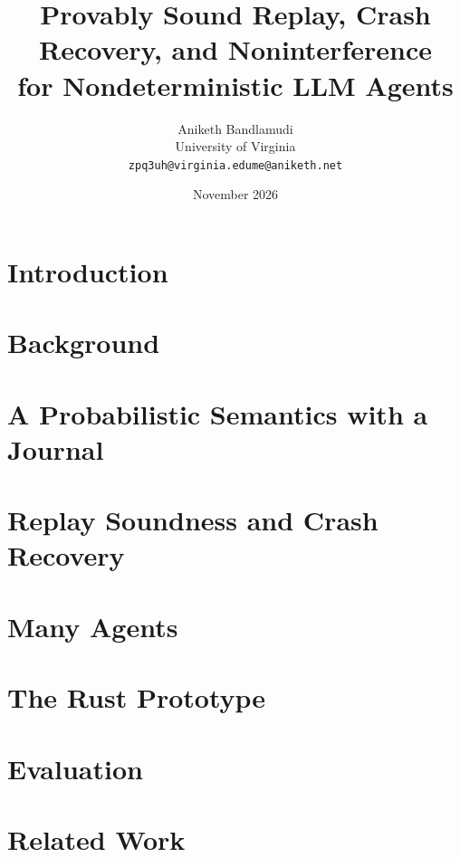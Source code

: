 \documentclass[11pt]{article}
\title{%
  Provably Sound Replay, Crash Recovery, and Noninterference \\
  for Nondeterministic LLM Agents
}
\author{
  Aniketh Bandlamudi \\
  \small University of Virginia \\
  \small\texttt{zpq3uh@virginia.edu}\quad\texttt{me@aniketh.net}
}
\date{November 2026}
\theoremstyle{definition}
\theoremstyle{remark}
\begin{document}
\maketitle

\begin{abstract}

\end{abstract}

\tableofcontents
\newpage

\section{Introduction}


\section{Background}
\label{sec:background}


\section{A Probabilistic Semantics with a Journal}
\label{sec:semantics}


\section{Replay Soundness and Crash Recovery}
\label{sec:metatheory}


\section{Many Agents}
\label{sec:multiagent}


\section{The Rust Prototype}
\label{sec:rust-runtime}


\section{Evaluation}
\label{sec:evaluation}


\section{Related Work}
\label{sec:related}

\end{document}
